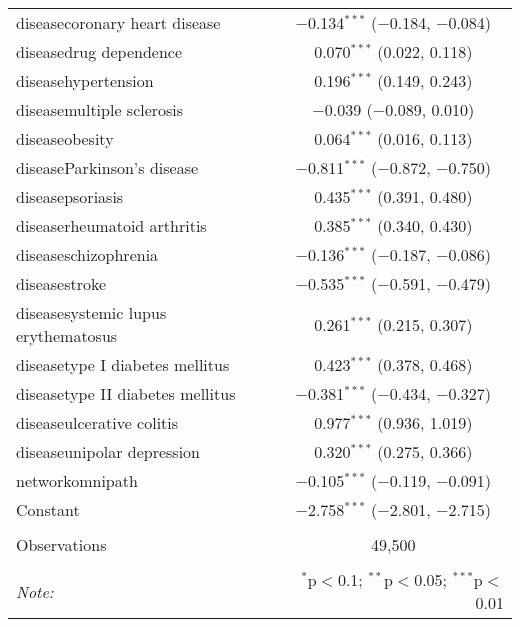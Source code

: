 \begin{table}[!htbp]
\begin{tabular}{@{\extracolsep{5pt}}lc}
  diseasecoronary heart disease & $-$0.134$^{***}$ ($-$0.184, $-$0.084) \\ 
  diseasedrug dependence & 0.070$^{***}$ (0.022, 0.118) \\ 
  diseasehypertension & 0.196$^{***}$ (0.149, 0.243) \\ 
  diseasemultiple sclerosis & $-$0.039 ($-$0.089, 0.010) \\ 
  diseaseobesity & 0.064$^{***}$ (0.016, 0.113) \\ 
  diseaseParkinson's disease & $-$0.811$^{***}$ ($-$0.872, $-$0.750) \\ 
  diseasepsoriasis & 0.435$^{***}$ (0.391, 0.480) \\ 
  diseaserheumatoid arthritis & 0.385$^{***}$ (0.340, 0.430) \\ 
  diseaseschizophrenia & $-$0.136$^{***}$ ($-$0.187, $-$0.086) \\ 
  diseasestroke & $-$0.535$^{***}$ ($-$0.591, $-$0.479) \\ 
  diseasesystemic lupus erythematosus & 0.261$^{***}$ (0.215, 0.307) \\ 
  diseasetype I diabetes mellitus & 0.423$^{***}$ (0.378, 0.468) \\ 
  diseasetype II diabetes mellitus & $-$0.381$^{***}$ ($-$0.434, $-$0.327) \\ 
  diseaseulcerative colitis & 0.977$^{***}$ (0.936, 1.019) \\ 
  diseaseunipolar depression & 0.320$^{***}$ (0.275, 0.366) \\ 
  networkomnipath & $-$0.105$^{***}$ ($-$0.119, $-$0.091) \\ 
  Constant & $-$2.758$^{***}$ ($-$2.801, $-$2.715) \\ 
 \hline \\[-1.8ex] 
Observations & 49,500 \\ 
\hline 
\hline \\[-1.8ex] 
\textit{Note:}  & \multicolumn{1}{r}{$^{*}$p$<$0.1; $^{**}$p$<$0.05; $^{***}$p$<$0.01} \\ 
\end{tabular} 
\end{table} 
